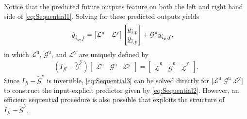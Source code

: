 Notice that the predicted future outputs feature on both the left and right hand side of \eqref{eq:Sequential1}. Solving for these predicted outputs yields
\begin{align}\label{eq:Sequential2}
    \underline{\hat{y}}_{\hat{i}_p,f} &=
    \begin{bmatrix}
        \mathcal{L}^\mathrm{u} & \mathcal{L}^\mathrm{y} 
    \end{bmatrix}    
    \begin{bmatrix}
        \underline{u}_{\hat{i},p}\\
        \underline{y}_{\hat{i},p}
    \end{bmatrix}+
    \mathcal{G}^\mathrm{u}
    \underline{u}_{\hat{i}_p,f},
\end{align}
in which $\mathcal{L}^\mathrm{u}$, $\mathcal{G}^\mathrm{u}$, and $\mathcal{L}^\mathrm{y}$ are uniquely defined by
\begin{align}\label{eq:Sequential3}
    \left(I_{fl}-\widetilde{\mathcal{G}}^\mathrm{y}\right)
    \begin{bmatrix}
        \mathcal{L}^\mathrm{u} & \mathcal{G}^\mathrm{u} & \mathcal{L}^\mathrm{y}
    \end{bmatrix}=
    \begin{bmatrix}
        \widetilde{\mathcal{L}}^\mathrm{u} & \widetilde{\mathcal{G}}^\mathrm{u} & \widetilde{\mathcal{L}}^\mathrm{y}
    \end{bmatrix}.
\end{align}
Since $I_{fl}-\widetilde{\mathcal{G}}^\mathrm{y}$ is invertible, \eqref{eq:Sequential3} can be solved directly for $\big[\mathcal{L}^\mathrm{u} \; \mathcal{G}^\mathrm{u} \; \mathcal{L}^\mathrm{y}\big]$ to construct the input-explicit predictor given by \eqref{eq:Sequential2}. However, an efficient sequential procedure is also possible that exploits the structure of $I_{fl}-\widetilde{\mathcal{G}}^\mathrm{y}$.

